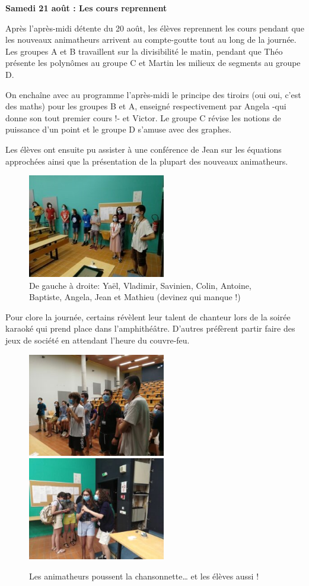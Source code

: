 \begin{center}
{\textbf{Samedi 21 août : Les cours reprennent}}
\end{center}
\vspace{2mm}

Après l’après-midi détente du 20 août, les élèves reprennent les cours pendant que les nouveaux animatheurs arrivent au compte-goutte tout au long de la journée. Les groupes A et B travaillent sur la divisibilité le matin, pendant que Théo présente les polynômes au groupe C et Martin les milieux de segments au groupe D.

On enchaîne avec au programme l’après-midi le principe des tiroirs (oui oui, c’est des maths) pour les groupes B et A, enseigné respectivement par Angela -qui donne son tout premier cours !- et Victor. Le groupe C révise les notions de puissance d’un point et le groupe D s’amuse avec des graphes.

Les élèves ont ensuite pu assister à une conférence de Jean sur les équations approchées ainsi que la présentation de la plupart des nouveaux animatheurs.

\begin{figure}[H]
\centering\includegraphics[width=6cm]{CR-21-0.jpg}
\caption{De gauche à droite: Yaël, Vladimir, Savinien, Colin, Antoine, Baptiste, Angela, Jean et Mathieu (devinez qui manque !)}
\end{figure}

Pour clore la journée, certains révèlent leur talent de chanteur lors de la soirée karaoké qui prend place dans l’amphithéâtre. D’autres préfèrent partir faire des jeux de société en attendant l’heure du couvre-feu.

\begin{figure}[H]
\centering\includegraphics[width=6cm]{CR-21-1.jpg}\hspace{2cm}\includegraphics[width=6cm]{CR-21-2.jpg}
\caption{Les animatheurs poussent la chansonnette… et les élèves aussi !}
\end{figure}